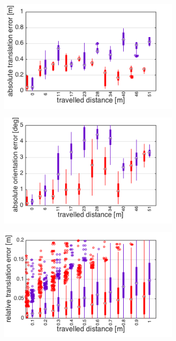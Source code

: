 \begin{figure}[h]
  \hfill
  \begin{subfigure}[b]{0.42\textwidth}
    \includegraphics[width=\textwidth]{images/slow/slow_ate.png}
    \caption{}
  \end{subfigure}
  \begin{subfigure}[b]{0.42\textwidth}
    \includegraphics[width=\textwidth]{images/slow/slow_aoe.png}
    \caption{}
  \end{subfigure}
  \hfill
  \begin{subfigure}[b]{0.42\textwidth}
    \includegraphics[width=\textwidth]{images/slow/slow_rte.png}

\end{subfigure}
\end{figure}
